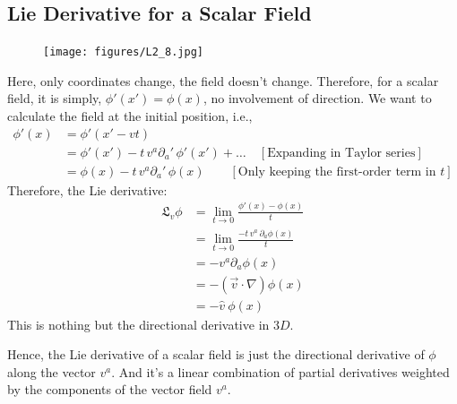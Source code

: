 \documentclass[14pt]{article} %
\begin{document}
\subsection{Lie Derivative for a Scalar Field}
\vspace{-0.5cm}
\begin{figure}[H]
\centering
\texttt{[image: figures/L2\_8.jpg]}
\caption*{}
\end{figure}
\vspace{-1cm}
Here, only coordinates change, the field doesn't change. Therefore, for a scalar field, it is simply, $\phi'(x') = \phi(x)$, no involvement of direction. We want to calculate the field at the initial position, i.e.,
\begin{align*}
\phi'(x) &= \phi'(x' - vt) \\
&= \phi'(x') - t\, v^a \partial_{a} '\, \phi'(x') + \dots \quad  [\text{Expanding in Taylor series}] \\
&= \phi(x) - t\, v^a \partial_a'\, \phi(x) \quad \quad [\text{Only keeping the first-order term in $t$}]
\end{align*}
Therefore, the Lie derivative:
\begin{align*}
\mathfrak{L}_v \phi &= \lim_{t \to 0} \frac{\phi'(x) - \phi(x)}{t} \\
&= \lim_{t \to 0} \frac{- t \,v^a\, \partial_a \phi(x)}{t} \\
&= -v^a \partial_a \phi(x) \\
&= - (\vec{v} \cdot \nabla) \phi(x) \\
&= - \hat{v}~ \phi(x)
\end{align*}
This is nothing but the directional derivative in $3D$.

Hence, the Lie derivative of a scalar field is just the directional derivative of $\phi$ along the vector $v^a$. And it's a linear combination of partial derivatives weighted by the components of the vector field $v^a$.
\end{document}
